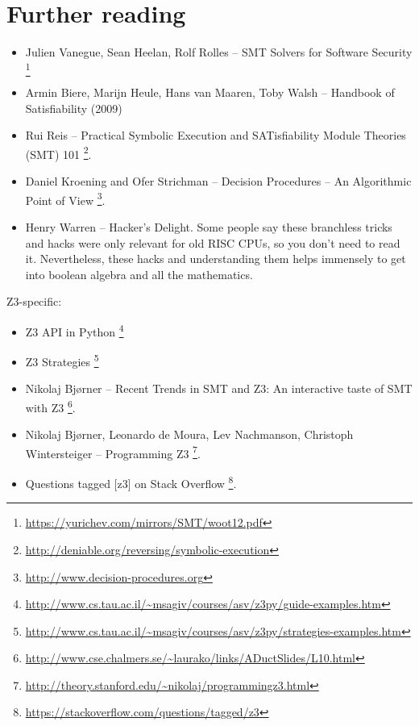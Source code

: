 \chapter{Further reading}

\begin{itemize}
\item Julien Vanegue, Sean Heelan, Rolf Rolles -- SMT Solvers for Software Security
\footnote{\url{https://yurichev.com/mirrors/SMT/woot12.pdf}}

\item Armin Biere, Marijn Heule, Hans van Maaren, Toby Walsh -- Handbook of Satisfiability (2009)

\item Rui Reis -- Practical Symbolic Execution and SATisfiability Module Theories (SMT) 101
\footnote{\url{http://deniable.org/reversing/symbolic-execution}}.

\item Daniel Kroening and Ofer Strichman -- Decision Procedures -- An Algorithmic Point of View
\footnote{\url{http://www.decision-procedures.org}}.

\item Henry Warren -- Hacker's Delight.
Some people say these branchless tricks and hacks were only relevant for old RISC CPUs, so you don't need to read it.
Nevertheless, these hacks and understanding them helps immensely to get into boolean algebra and all the mathematics.
\end{itemize}

Z3-specific:

\begin{itemize}
\item Z3 API in Python
\footnote{\url{http://www.cs.tau.ac.il/~msagiv/courses/asv/z3py/guide-examples.htm}}

\item Z3 Strategies
\footnote{\url{http://www.cs.tau.ac.il/~msagiv/courses/asv/z3py/strategies-examples.htm}}

\item Nikolaj Bjørner -- Recent Trends in SMT and Z3: An interactive taste of SMT with Z3
\footnote{\url{http://www.cse.chalmers.se/~laurako/links/ADuctSlides/L10.html}}.

\item Nikolaj Bjørner, Leonardo de Moura, Lev Nachmanson, Christoph Wintersteiger -- Programming Z3
\footnote{\url{http://theory.stanford.edu/~nikolaj/programmingz3.html}}.

\item Questions tagged [z3] on Stack Overflow
\footnote{\url{https://stackoverflow.com/questions/tagged/z3}}.
\end{itemize}


